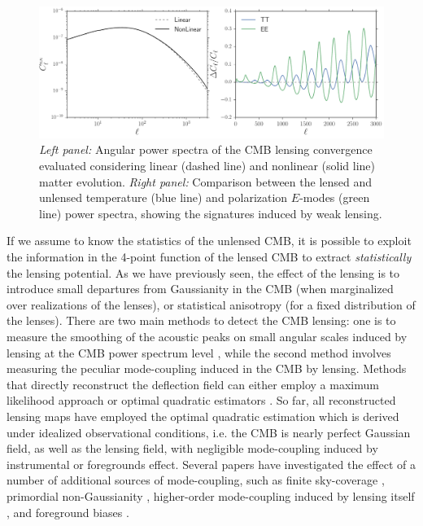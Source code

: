\begin{figure} %
\centering %
\includegraphics[width=\textwidth]{Chapter1/Images/cmblens2}
\caption{\emph{Left panel:} Angular power spectra of the \gls{CMB} lensing convergence evaluated considering linear (dashed line) and nonlinear (solid line) matter evolution. \emph{Right panel:} Comparison between the lensed and unlensed temperature (blue line) and polarization $E$-modes (green line) power spectra, showing the signatures induced by weak lensing. \label{fig:cmb_lens}}
\end{figure}

If we assume to know the statistics of the unlensed \gls{CMB}, it is possible to exploit the information in the
4-point function of the lensed \gls{CMB} to extract \emph{statistically} the lensing potential.  
As we have previously seen, the effect of the lensing is to introduce small departures from Gaussianity in 
the \gls{CMB} (when marginalized over realizations of the lenses), or statistical anisotropy (for a fixed 
distribution of the lenses). There are two main methods to detect the \gls{CMB} lensing: one is to measure 
the smoothing of the acoustic peaks on small angular scales induced by lensing at the \gls{CMB} power 
spectrum level \citep{Reichardt2009,Dunkley2010,Keisler2011,Ade2014d}, while the second method 
involves measuring the peculiar mode-coupling induced in the \gls{CMB} by lensing. Methods that directly 
reconstruct  the deflection field can either employ a maximum likelihood approach \citep{Hirata2003} or 
optimal  quadratic estimators \citep{Hu2002}. So far, all reconstructed lensing maps have employed the
optimal quadratic estimation which is derived under idealized observational conditions, i.e. the \gls{CMB} is 
nearly  perfect Gaussian field, as well as the lensing field, with negligible mode-coupling induced by 
instrumental or foregrounds effect. Several papers have investigated the effect of a number of additional 
sources of  mode-coupling, such as finite sky-coverage \citep{Perotto2010,Namikawa2013}, primordial 
non-Gaussianity \citep{Lesgourgues2005}, higher-order mode-coupling induced by lensing itself 
\citep{Kesden2003,Hanson2011}, and foreground biases 
\citep{Fantaye2012,Osborne2014,VanEngelen2014}.

